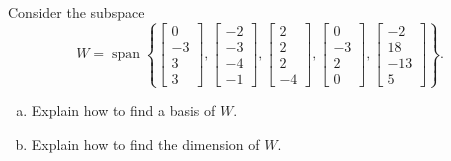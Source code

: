 
\begin{exerciseStatement}


Consider the subspace \[W=\operatorname{span}  \left\{ \left[\begin{array}{c}
0 \\
-3 \\
3 \\
3
\end{array}\right] , \left[\begin{array}{c}
-2 \\
-3 \\
-4 \\
-1
\end{array}\right] , \left[\begin{array}{c}
2 \\
2 \\
2 \\
-4
\end{array}\right] , \left[\begin{array}{c}
0 \\
-3 \\
2 \\
0
\end{array}\right] , \left[\begin{array}{c}
-2 \\
18 \\
-13 \\
5
\end{array}\right] \right\} .\]


\begin{enumerate}[(a)]
\item  Explain how to find a basis of \(W\).
\item  Explain how to find the dimension of \(W\).
\end{enumerate}
    
\end{exerciseStatement}
    
